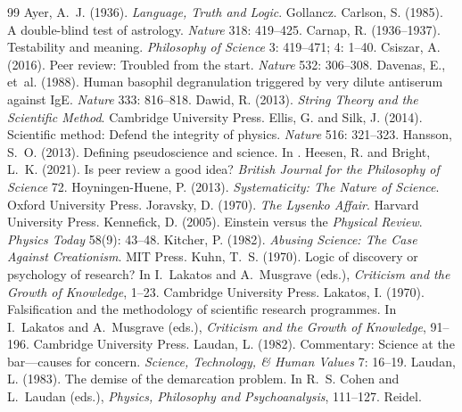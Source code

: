 \documentclass{situationist-preprint}
\begin{document}
\begin{thebibliography}{99}\small
{} Ayer, A.~J. (1936). \emph{Language, Truth and Logic}. Gollancz.
 Carlson, S. (1985). A double-blind test of astrology. \emph{Nature} 318: 419--425.
 Carnap, R. (1936--1937). Testability and meaning. \emph{Philosophy of Science} 3: 419--471; 4: 1--40.
 Csiszar, A. (2016). Peer review: Troubled from the start. \emph{Nature} 532: 306--308.
 Davenas, E., et~al. (1988). Human basophil degranulation triggered by very dilute antiserum against IgE. \emph{Nature} 333: 816--818.
 Dawid, R. (2013). \emph{String Theory and the Scientific Method}. Cambridge University Press.
 Ellis, G. and Silk, J. (2014). Scientific method: Defend the integrity of physics. \emph{Nature} 516: 321--323.
 Hansson, S.~O. (2013). Defining pseudoscience and science. In \citet{PigliucciBoudry2013}.
 Heesen, R. and Bright, L.~K. (2021). Is peer review a good idea? \emph{British Journal for the Philosophy of Science} 72.
 Hoyningen-Huene, P. (2013). \emph{Systematicity: The Nature of Science}. Oxford University Press.
 Joravsky, D. (1970). \emph{The Lysenko Affair}. Harvard University Press.
 Kennefick, D. (2005). Einstein versus the \emph{Physical Review}. \emph{Physics Today} 58(9): 43--48.
 Kitcher, P. (1982). \emph{Abusing Science: The Case Against Creationism}. MIT Press.
 Kuhn, T.~S. (1970). Logic of discovery or psychology of research? In I.~Lakatos and A.~Musgrave (eds.), \emph{Criticism and the Growth of Knowledge}, 1--23. Cambridge University Press.
 Lakatos, I. (1970). Falsification and the methodology of scientific research programmes. In I.~Lakatos and A.~Musgrave (eds.), \emph{Criticism and the Growth of Knowledge}, 91--196. Cambridge University Press.
 Laudan, L. (1982). Commentary: Science at the bar---causes for concern. \emph{Science, Technology, \& Human Values} 7: 16--19.
 Laudan, L. (1983). The demise of the demarcation problem. In R.~S. Cohen and L.~Laudan (eds.), \emph{Physics, Philosophy and Psychoanalysis}, 111--127. Reidel.

\end{thebibliography}
\end{document}
